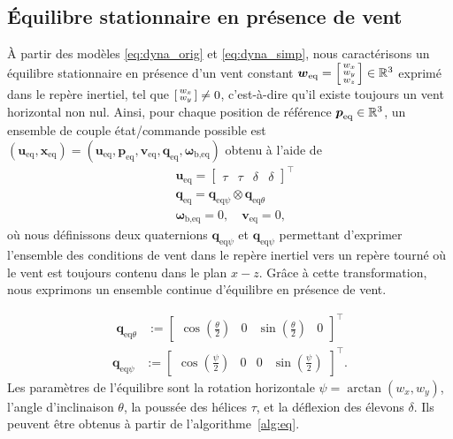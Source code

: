     \subsection{Équilibre stationnaire en présence de vent}
    À partir des modèles \eqref{eq:dyna_orig} et \eqref{eq:dyna_simp}, nous caractérisons un équilibre stationnaire en présence d'un vent constant $\boldsymbol{w}_{\mathrm{eq}} =\left[ \begin{smallmatrix}w_x \\ w_y \\w_z \end{smallmatrix} \right] \in {\mathbb R}^3$ exprimé dans le repère inertiel, tel que $\left[ \begin{smallmatrix}w_x \\ w_y \end{smallmatrix} \right] \neq 0$, c'est-à-dire qu'il existe toujours un vent horizontal non nul.
    Ainsi, pour chaque position de référence $\boldsymbol{p}_{\text{eq}} \in {\mathbb R}^3$, 
    un ensemble de couple état/commande possible est $(\boldsymbol{u}_{\text{eq}}, \boldsymbol{x}_{\text{eq}}) = (\boldsymbol{u}_{\text{eq}}, \boldsymbol{p}_{\text{eq}}, \boldsymbol{v}_{\text{eq}}, \boldsymbol{q}_{\text{eq}}, \boldsymbol{\omega}_{\text{b},\text{eq}})$
    obtenu à l'aide de
    \begin{subequations}
    \label{eq:equilibrium}
    \begin{align}
    \label{eq:ueq}
            &\boldsymbol{u}_{\text{eq}} = \begin{bmatrix} \tau & \tau & \delta & \delta \end{bmatrix}^\top\\
            & \boldsymbol{q}_{\text{eq}} = \boldsymbol{q}_{\mathrm{eq}\psi} \otimes  \boldsymbol{q}_{\mathrm{eq}\theta} \label{eq:qeq}\\
            &\boldsymbol{\omega}_{\text{b},\text{eq}} = 0 , \quad \boldsymbol{v}_{\text{eq}} = 0, 
    \end{align}
    \end{subequations}
    où nous définissons deux quaternions $\boldsymbol{q}_{\mathrm{eq}\psi}$ et $\boldsymbol{q}_{\mathrm{eq}\psi}$ permettant d'exprimer l'ensemble des conditions de vent dans le repère inertiel vers un repère tourné où le vent est toujours contenu dans le plan $x-z$. Grâce à cette transformation, nous exprimons un ensemble continue d'équilibre en présence de vent. 

    \begin{align}
    \label{eq:qtheta}
        \boldsymbol{q}_{\mathrm{eq}\theta} &:= \begin{bmatrix} \cos(\frac{\theta}{2}) & 0 & \sin(\frac{\theta}{2}) & 0 \end{bmatrix}^\top
    \end{align}
    \begin{align}
    \label{eq:qpsi}
        \boldsymbol{q}_{\mathrm{eq}\psi} &:= \begin{bmatrix} \cos(\frac{\psi}{2}) & 0 & 0 & \sin(\frac{\psi}{2}) \end{bmatrix}^\top.
    \end{align}
    Les paramètres de l'équilibre sont la rotation horizontale $\psi = \arctan(w_{x}, w_{y})$, l'angle d'inclinaison $\theta$, la poussée des hélices $\tau$, et la déflexion des élevons $\delta$. Ils peuvent être obtenus à partir de l'algorithme~\ref{alg:eq}. 

